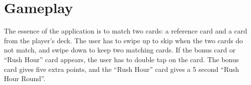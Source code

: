 \section{Gameplay}
The essence of the application is to match two cards: a reference card and a card from the player’s deck. The user has to swipe up to skip when the two cards do not match, and swipe down to keep two matching cards. If the bonus card or “Rush Hour” card appears, the user has to double tap on the card. The bonus card gives five extra points, and the “Rush Hour” card gives a 5 second “Rush Hour Round”.
